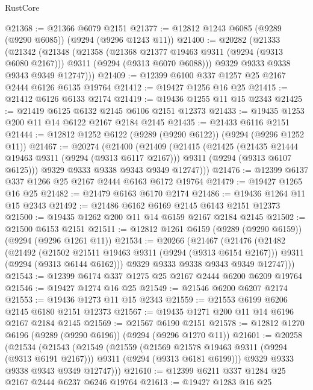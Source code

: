 \begin{lexlean}{RustCore}
\begin{coremodule}
@21368 := @21366 @6079 @2151
@21377 := @12812 @1243 @6085 (@9289 (@9290 @6085)) (@9294 (@9296 @1243 @11))
@21400 := @20282
    (@21333
      (@21342
        (@21348
          (@21358
            (@21368 @21377 @19463 @9311 (@9294 (@9313 @6080 @2167)))
            @9311
            (@9294 (@9313 @6070 @6088)))
          @9329
          @9333
          @9338
          @9343
          @9349
          @12747)))
@21409 := @12399 @6100 @337 @1257 @25 @2167 @2444 @6126 @6135 @19764
@21412 := @19427 @1256 @16 @25
@21415 := @21412 @6126 @6133 @2174
@21419 := @19436 @1255 @11 @15 @2343
@21425 := @21419 @6125 @6132 @2145 @6106 @2151 @12373
@21433 := @19435 @1253 @200 @11 @14 @6122 @2167 @2184 @2145
@21435 := @21433 @6116 @2151
@21444 := @12812 @1252 @6122 (@9289 (@9290 @6122)) (@9294 (@9296 @1252 @11))
@21467 := @20274
    (@21400
      (@21409
        (@21415
          (@21425
            (@21435 @21444 @19463 @9311 (@9294 (@9313 @6117 @2167)))
            @9311
            (@9294 (@9313 @6107 @6125)))
          @9329
          @9333
          @9338
          @9343
          @9349
          @12747)))
@21476 := @12399 @6137 @337 @1266 @25 @2167 @2444 @6163 @6172 @19764
@21479 := @19427 @1265 @16 @25
@21482 := @21479 @6163 @6170 @2174
@21486 := @19436 @1264 @11 @15 @2343
@21492 := @21486 @6162 @6169 @2145 @6143 @2151 @12373
@21500 := @19435 @1262 @200 @11 @14 @6159 @2167 @2184 @2145
@21502 := @21500 @6153 @2151
@21511 := @12812 @1261 @6159 (@9289 (@9290 @6159)) (@9294 (@9296 @1261 @11))
@21534 := @20266
    (@21467
      (@21476
        (@21482
          (@21492
            (@21502 @21511 @19463 @9311 (@9294 (@9313 @6154 @2167)))
            @9311
            (@9294 (@9313 @6144 @6162)))
          @9329
          @9333
          @9338
          @9343
          @9349
          @12747)))
@21543 := @12399 @6174 @337 @1275 @25 @2167 @2444 @6200 @6209 @19764
@21546 := @19427 @1274 @16 @25
@21549 := @21546 @6200 @6207 @2174
@21553 := @19436 @1273 @11 @15 @2343
@21559 := @21553 @6199 @6206 @2145 @6180 @2151 @12373
@21567 := @19435 @1271 @200 @11 @14 @6196 @2167 @2184 @2145
@21569 := @21567 @6190 @2151
@21578 := @12812 @1270 @6196 (@9289 (@9290 @6196)) (@9294 (@9296 @1270 @11))
@21601 := @20258
    (@21534
      (@21543
        (@21549
          (@21559
            (@21569 @21578 @19463 @9311 (@9294 (@9313 @6191 @2167)))
            @9311
            (@9294 (@9313 @6181 @6199)))
          @9329
          @9333
          @9338
          @9343
          @9349
          @12747)))
@21610 := @12399 @6211 @337 @1284 @25 @2167 @2444 @6237 @6246 @19764
@21613 := @19427 @1283 @16 @25

\end{coremodule}
\end{lexlean}
